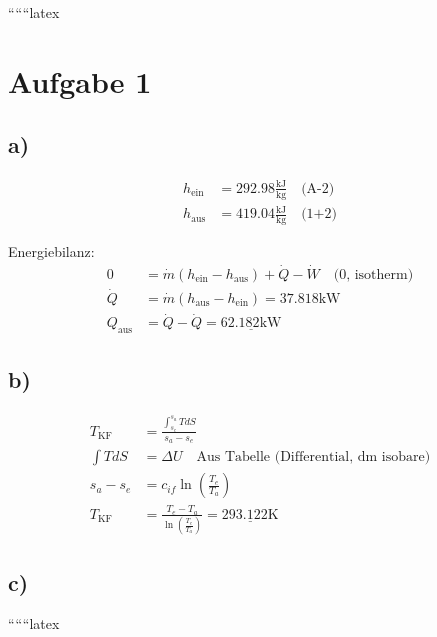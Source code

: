 
``````latex


\section*{Aufgabe 1}

\subsection*{a)}
\begin{align*}
    h_{\text{ein}} &= 292.98 \frac{\text{kJ}}{\text{kg}} \quad \text{(A-2)} \\
    h_{\text{aus}} &= 419.04 \frac{\text{kJ}}{\text{kg}} \quad \text{(1+2)}
\end{align*}

Energiebilanz:
\begin{align*}
    0 &= \dot{m} (h_{\text{ein}} - h_{\text{aus}}) + \dot{Q} - \dot{W} \quad \text{(0, isotherm)} \\
    \dot{Q} &= \dot{m} (h_{\text{aus}} - h_{\text{ein}}) = 37.818 \text{kW} \\
    Q_{\text{aus}} &= \dot{Q} - \dot{Q} = \underline{62.182 \text{kW}}
\end{align*}

\subsection*{b)}
\begin{align*}
    T_{\text{KF}} &= \frac{\int_{s_e}^{s_a} T dS}{s_a - s_e} \\
    \int T dS &= \Delta U \quad \text{Aus Tabelle (Differential, dm isobare)} \\
    s_{a} - s_{e} &= c_{if} \ln \left( \frac{T_e}{T_a} \right) \\
    T_{\text{KF}} &= \frac{T_e - T_a}{\ln \left( \frac{T_e}{T_a} \right)} = \underline{293.122 \text{K}}
\end{align*}

\subsection*{c)}
``````latex


